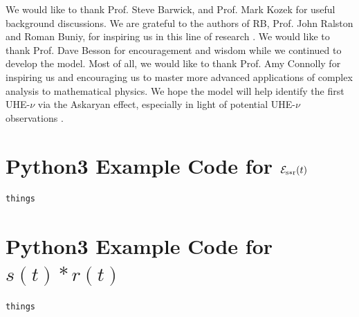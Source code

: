 \documentclass[amsmath,amssymb,aps,prd,10pt,twocolumn,showkeys]{revtex4}
\begin{document}
We would like to thank Prof. Steve Barwick, and Prof. Mark Kozek for useful background discussions.  We are grateful to the authors of RB, Prof. John Ralston and Roman Buniy, for inspiring us in this line of research \cite{10.1103/physrevd.65.016003}.  We would like to thank Prof. Dave Besson for encouragement and wisdom while we continued to develop the model.  Most of all, we would like to thank Prof. Amy Connolly for inspiring us and encouraging us to master more advanced applications of complex analysis to mathematical physics.  We hope the model will help identify the first UHE-$\nu$ via the Askaryan effect, especially in light of potential UHE-$\nu$ observations \cite{collaboration2025observation-22f}.

\appendix

\section{Python3 Example Code for $\mathcal{E}_{\rm s * r}(t)$}
\label{sec:appA}

\begin{verbatim}
things
\end{verbatim}

\section{Python3 Example Code for $s(t) * r(t)$}
\label{sec:appA}

\begin{verbatim}
things
\end{verbatim}


\end{document}
